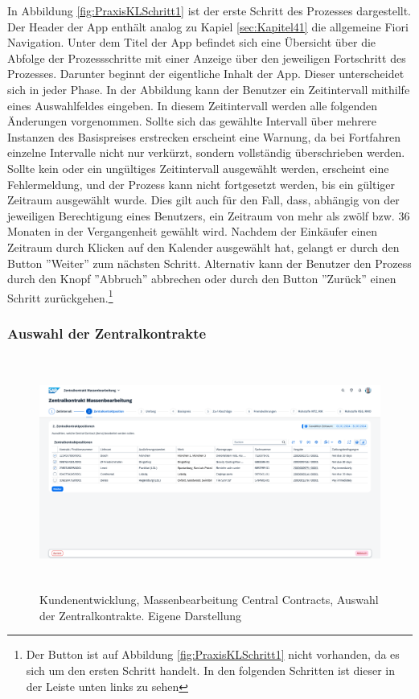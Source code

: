 In Abbildung \ref{fig:PraxisKLSchritt1} ist der erste Schritt des Prozesses dargestellt. Der Header der App enthält analog zu  Kapiel \ref{sec:Kapitel41} die allgemeine Fiori Navigation. Unter dem Titel der App befindet sich eine Übersicht über die Abfolge der Prozessschritte mit einer Anzeige über den jeweiligen Fortschritt des Prozesses. Darunter beginnt der eigentliche Inhalt der App. Dieser unterscheidet sich in jeder Phase. In der Abbildung kann der Benutzer ein Zeitintervall mithilfe eines Auswahlfeldes eingeben. In diesem Zeitintervall werden alle folgenden Änderungen vorgenommen. Sollte sich das gewählte Intervall über mehrere Instanzen des Basispreises erstrecken erscheint eine Warnung, da bei Fortfahren einzelne Intervalle nicht nur verkürzt, sondern vollständig überschrieben werden. Sollte kein oder ein ungültiges Zeitintervall ausgewählt werden, erscheint eine Fehlermeldung, und der Prozess kann nicht fortgesetzt werden, bis ein gültiger Zeitraum ausgewählt wurde. Dies gilt auch für den Fall, dass, abhängig von der jeweiligen Berechtigung eines Benutzers, ein Zeitraum von mehr als zwölf bzw. 36 Monaten in der Vergangenheit gewählt wird. Nachdem der Einkäufer einen Zeitraum durch Klicken auf den Kalender ausgewählt hat, gelangt er durch den Button ''Weiter'' zum nächsten Schritt. Alternativ kann der Benutzer den Prozess durch den Knopf ''Abbruch'' abbrechen oder durch den Button ''Zurück'' einen Schritt zurückgehen.\footnote{Der Button ist auf Abbildung \ref{fig:PraxisKLSchritt1} nicht vorhanden, da es sich um den ersten Schritt handelt. In den folgenden Schritten ist dieser in der Leiste unten links zu sehen}

\subsubsection{Auswahl der Zentralkontrakte} \label{sec:Kapitel422}

\begin{figure}[H]
    \centering
    \includegraphics[height=7.66cm]{Bilder/Praxisteil-KL-Schritt-2.png}
    \caption[Kundenentwicklung, Massenbearbeitung Central Contracts, Auswahl der Zentralkontrakte]{Kundenentwicklung, Massenbearbeitung Central Contracts, Auswahl der Zentralkontrakte. Eigene Darstellung}
    \label{fig:PraxisKLSchritt2}
\end{figure}

